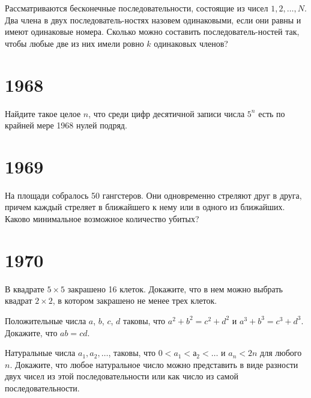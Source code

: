 \documentclass[11pt, a4paper]{template}
\begin{document}
\begin{exercise}
Рассматриваются бесконечные последовательности, состоящие из чисел $1, 2, \dots, N$. Два члена в двух последователь-ностях назовем одинаковыми, если они равны и имеют одинаковые номера. Сколько можно составить последователь-ностей так, чтобы любые две из них имели ровно $k$ одинаковых членов?
\end{exercise}

\chapter{1968}

\begin{exercise}
Найдите такое целое $n$, что среди цифр десятичной записи числа $5^{n}$ есть по крайней мере 1968 нулей подряд.
\end{exercise}

\chapter{1969}

\begin{exercise}
На площади собралось 50 гангстеров. Они одновременно стреляют друг в друга, причем каждый стреляет в ближайшего к нему или в одного из ближайших. Каково минимальное возможное количество убитых?
\end{exercise}

\chapter{1970}

\begin{exercise}
В квадрате $5 \times 5$ закрашено 16 клеток. Докажите, что в нем можно выбрать квадрат $2 \times 2$, в котором закрашено не менее трех клеток.
\end{exercise}

\begin{exercise}
Положительные числа $a$, $b$, $c$, $d$ таковы, что $a^{2} + b^{2} = c^{2} + d^{2}$ и $a^{3} + b^{3} = c^{3} + d^{3}$. Докажите, что $ab = cd$.
\end{exercise}

\begin{solution}

\end{solution}

\begin{exercise}
Натуральные числа $a_{1}, a_{2}, \dots$, таковы, что $0 < a_{1} < а_{2} < \dots$ и $a_{n} < 2n$ для любого $n$. Докажите, что любое натуральное число можно представить в виде разности двух чисел из этой последовательности или как число из самой последовательности.
\end{exercise}
\end{document}
